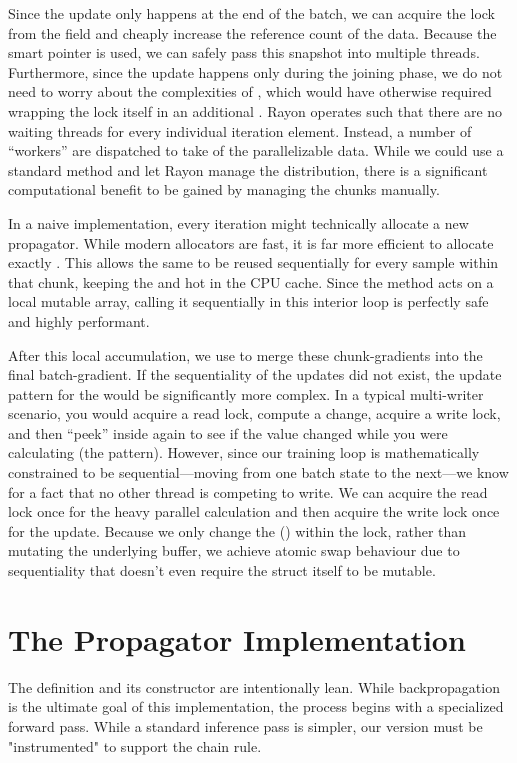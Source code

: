 Since the update only happens at the end of the batch, we can acquire the  lock from the  field and cheaply increase the reference count of the data. Because the  smart pointer is used, we can safely pass this snapshot into multiple threads. Furthermore, since the update happens only during the joining phase, we do not need to worry about the complexities of , which would have otherwise required wrapping the lock itself in an additional . Rayon operates such that there are no waiting threads for every individual iteration element. Instead, a number of \enquote{workers} are dispatched to take  of the parallelizable data. While we could use a standard  method and let Rayon manage the distribution, there is a significant computational benefit to be gained by managing the chunks manually. \par In a naive  implementation, every iteration might technically allocate a new propagator. While modern allocators are fast, it is far more efficient to allocate exactly . This allows the same  to be reused sequentially for every sample within that chunk, keeping the  and  hot in the CPU cache. Since the  method acts on a local mutable array, calling it sequentially in this interior loop is perfectly safe and highly performant.\par After this local accumulation, we use  to merge these chunk-gradients into the final batch-gradient. If the sequentiality of the updates did not exist, the update pattern for the  would be significantly more complex. In a typical multi-writer scenario, you would acquire a read lock, compute a change, acquire a write lock, and then \enquote{peek} inside again to see if the value changed while you were calculating (the  pattern). However, since our training loop is mathematically constrained to be sequential—moving from one batch state to the next—we know for a fact that no other thread is competing to write. We can acquire the read lock once for the heavy parallel calculation and then acquire the write lock once for the update. Because we only change the  () within the lock, rather than mutating the underlying buffer, we achieve atomic swap behaviour due to sequentiality that doesn't even require the  struct itself to be mutable.
\newpage\section{The Propagator Implementation}
The  definition and its constructor are intentionally lean. While backpropagation is the ultimate goal of this implementation, the process begins with a specialized forward pass. While a standard inference pass is simpler, our version must be "instrumented" to support the chain rule.
